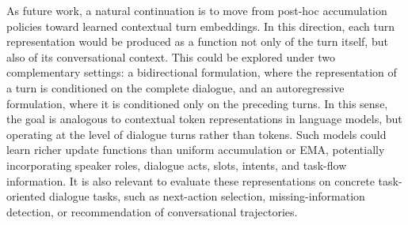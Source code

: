 \documentclass[runningheads]{llncs}
\begin{document}
As future work, a natural continuation is to move from post-hoc accumulation policies toward learned contextual turn embeddings. In this direction, each turn representation would be produced as a function not only of the turn itself, but also of its conversational context. This could be explored under two complementary settings: a bidirectional formulation, where the representation of a turn is conditioned on the complete dialogue, and an autoregressive formulation, where it is conditioned only on the preceding turns. In this sense, the goal is analogous to contextual token representations in language models, but operating at the level of dialogue turns rather than tokens. Such models could learn richer update functions than uniform accumulation or EMA, potentially incorporating speaker roles, dialogue acts, slots, intents, and task-flow information. It is also relevant to evaluate these representations on concrete task-oriented dialogue tasks, such as next-action selection, missing-information detection, or recommendation of conversational trajectories.



\end{document}
